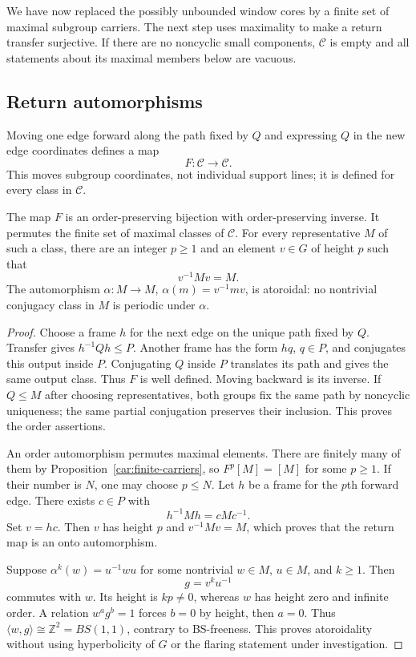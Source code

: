 We have now replaced the possibly unbounded window cores by a
finite set of maximal subgroup carriers.  The next step uses
maximality to make a return transfer surjective.  If there are no
noncyclic small components, $\mathcal C$ is empty and all statements
about its maximal members below are vacuous.

\subsection{Return automorphisms}

Moving one edge forward along the path fixed by $Q$ and expressing
$Q$ in the new edge coordinates defines a map
\[
 F:\mathcal C\longrightarrow\mathcal C.
\]
This moves subgroup coordinates, not individual support lines;
it is defined for every class in $\mathcal C$.

\begin{proposition}
\label{car:return}
The map $F$ is an order-preserving bijection with order-preserving
inverse.  It permutes the finite set of maximal classes of
$\mathcal C$.  For every representative $M$ of such a class, there
are an integer $p\ge1$ and an element $v\in G$ of height $p$ such
that
\[
 v^{-1}Mv=M.
\]
The automorphism $\alpha:M\to M$, $\alpha(m)=v^{-1}mv$, is
atoroidal: no nontrivial conjugacy class in $M$ is periodic under
$\alpha$.
\end{proposition}

\begin{proof}
Choose a frame $h$ for the next edge on the unique path fixed by
$Q$.  Transfer gives $h^{-1}Qh\le P$.  Another frame has the form
$hq$, $q\in P$, and conjugates this output inside $P$.
Conjugating $Q$ inside $P$ translates its path and gives the same
output class.  Thus $F$ is well defined.  Moving backward is its
inverse.  If $Q\le M$ after choosing representatives, both groups
fix the same path by noncyclic uniqueness; the same partial
conjugation preserves their inclusion.  This proves the order
assertions.

An order automorphism permutes maximal elements.  There are
finitely many of them by Proposition~\ref{car:finite-carriers},
so $F^p[M]=[M]$ for some $p\ge1$.  If their number is $N$, one
may choose $p\le N$.  Let $h$ be a frame for the $p$th forward
edge.  There exists $c\in P$ with
\[
 h^{-1}Mh=cMc^{-1}.
\]
Set $v=hc$.  Then $v$ has height $p$ and
$v^{-1}Mv=M$, which proves that the return map is an onto
automorphism.

Suppose $\alpha^k(w)=u^{-1}wu$ for some nontrivial $w\in M$,
$u\in M$, and $k\ge1$.  Then
\[
 g=v^ku^{-1}
\]
commutes with $w$.  Its height is $kp\ne0$, whereas $w$ has
height zero and infinite order.  A relation $w^a g^b=1$ forces
$b=0$ by height, then $a=0$.  Thus
$\langle w,g\rangle\cong\mathbb Z^2=BS(1,1)$, contrary to
BS-freeness.  This proves atoroidality without using hyperbolicity
of $G$ or the flaring statement under investigation.
\end{proof}

